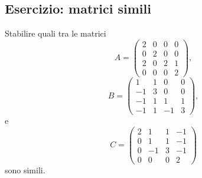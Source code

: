 \documentclass[a4paper]{article}
\begin{document}
\subsection{Esercizio: matrici simili}

\begin{radioactive}
\begin{snippetexercise}{}
    Stabilire quali tra le matrici
    \[
        A=
        \begin{pmatrix}
            2 & 0 & 0 & 0\\
            0 & 2 & 0 & 0\\
            2 & 0 & 2 & 1\\
            0 & 0 & 0 & 2
        \end{pmatrix},
    \]
    \[
        B=
        \begin{pmatrix}
            1 & 1 & 0 & 0\\
            -1 & 3 & 0 & 0\\
            -1 & 1 & 1 & 1\\
            -1 & 1 & -1 & 3
        \end{pmatrix},
    \]
    e
    \[
        C=
        \begin{pmatrix}
            2 & 1 & 1 & -1\\
            0 & 1 & 1 & -1\\
            0 & -1 & 3 & -1\\
            0 & 0 & 0 & 2
        \end{pmatrix}
    \]
    sono simili.
\end{snippetexercise}
\end{radioactive}
\end{document}
